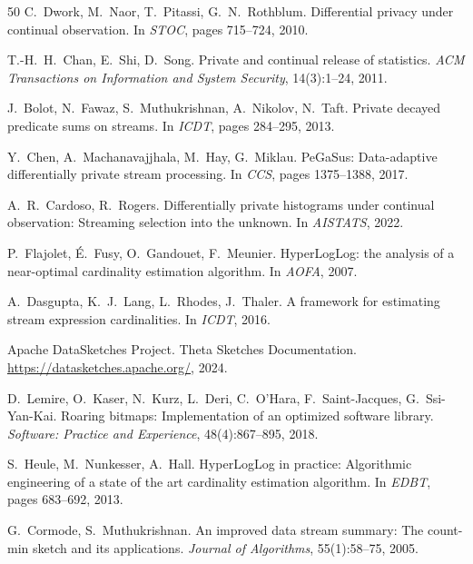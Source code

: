 \documentclass[sigconf,anonymous,review]{acmart}
\begin{document}
\begin{thebibliography}{50}
    C.~Dwork, M.~Naor, T.~Pitassi, G.~N.~Rothblum.
    \newblock Differential privacy under continual observation.
    \newblock In \emph{STOC}, pages 715--724, 2010.

    T.-H.~H.~Chan, E.~Shi, D.~Song.
    \newblock Private and continual release of statistics.
    \newblock \emph{ACM Transactions on Information and System Security}, 14(3):1--24, 2011.


    J.~Bolot, N.~Fawaz, S.~Muthukrishnan, A.~Nikolov, N.~Taft.
    \newblock Private decayed predicate sums on streams.
    \newblock In \emph{ICDT}, pages 284--295, 2013.

    Y.~Chen, A.~Machanavajjhala, M.~Hay, G.~Miklau.
    \newblock PeGaSus: Data-adaptive differentially private stream processing.
    \newblock In \emph{CCS}, pages 1375--1388, 2017.

    A.~R.~Cardoso, R.~Rogers.
    \newblock Differentially private histograms under continual observation: Streaming selection into the unknown.
    \newblock In \emph{AISTATS}, 2022.

    P.~Flajolet, É.~Fusy, O.~Gandouet, F.~Meunier.
    \newblock HyperLogLog: the analysis of a near-optimal cardinality estimation algorithm.
    \newblock In \emph{AOFA}, 2007.

    A.~Dasgupta, K.~J.~Lang, L.~Rhodes, J.~Thaler.
    \newblock A framework for estimating stream expression cardinalities.
    \newblock In \emph{ICDT}, 2016.

    Apache DataSketches Project.
    \newblock Theta Sketches Documentation.
    \newblock \url{https://datasketches.apache.org/}, 2024.

    D.~Lemire, O.~Kaser, N.~Kurz, L.~Deri, C.~O'Hara, F.~Saint-Jacques, G.~Ssi-Yan-Kai.
    \newblock Roaring bitmaps: Implementation of an optimized software library.
    \newblock \emph{Software: Practice and Experience}, 48(4):867--895, 2018.

    S.~Heule, M.~Nunkesser, A.~Hall.
    \newblock HyperLogLog in practice: Algorithmic engineering of a state of the art cardinality estimation algorithm.
    \newblock In \emph{EDBT}, pages 683--692, 2013.

    G.~Cormode, S.~Muthukrishnan.
    \newblock An improved data stream summary: The count-min sketch and its applications.
    \newblock \emph{Journal of Algorithms}, 55(1):58--75, 2005.


\end{thebibliography}
\end{document}
